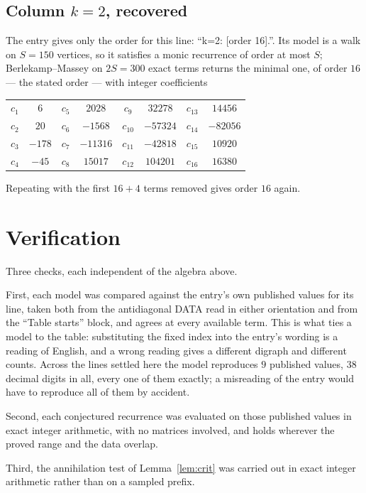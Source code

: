 \documentclass[11pt,a4paper]{article}
\theoremstyle{plain}
\theoremstyle{definition}
\begin{document}
\subsection*{Column $k=2$, recovered}
The entry gives only the order for this line: ``k=2: [order 16].''. Its model is a walk on
$S=150$ vertices, so it satisfies a monic recurrence of order at most $S$;
Berlekamp--Massey on $2S=300$ exact terms returns the minimal one, of order
$16$ --- the stated order --- with integer coefficients
\begin{center}\small\begin{tabular}{cccccccc}
$c_{1}$ & $6$ & $c_{5}$ & $2028$ & $c_{9}$ & $32278$ & $c_{13}$ & $14456$ \\
$c_{2}$ & $20$ & $c_{6}$ & $-1568$ & $c_{10}$ & $-57324$ & $c_{14}$ & $-82056$ \\
$c_{3}$ & $-178$ & $c_{7}$ & $-11316$ & $c_{11}$ & $-42818$ & $c_{15}$ & $10920$ \\
$c_{4}$ & $-45$ & $c_{8}$ & $15017$ & $c_{12}$ & $104201$ & $c_{16}$ & $16380$ \\
\end{tabular}\end{center}
Repeating with the first $16+4$ terms removed gives order $16$ again.

\section{Verification}

Three checks, each independent of the algebra above.

First, each model was compared against the entry's own published values for its line, taken
both from the antidiagonal DATA read in either orientation and from the ``Table starts''
block, and agrees at every available term. This is what ties a model to the table:
substituting the fixed index into the entry's wording is a reading of English, and a wrong
reading gives a different digraph and different counts. Across the lines settled here the
model reproduces $9$ published values, $38$ decimal digits in all, every one of
them exactly; a misreading of the entry would have to reproduce all of them by accident.

Second, each conjectured recurrence was evaluated on those published values in exact
integer arithmetic, with no matrices involved, and holds wherever the proved range and the
data overlap.

Third, the annihilation test of Lemma~\ref{lem:crit} was carried out in exact integer
arithmetic rather than on a sampled prefix.
\end{document}
